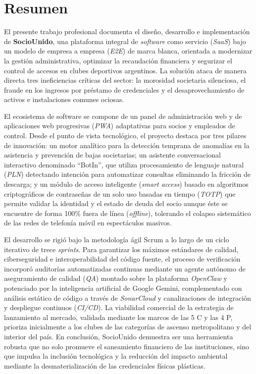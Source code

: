 \section{Resumen}

El presente trabajo profesional documenta el diseño, desarrollo e implementación de \textbf{SocioUnido}, una plataforma integral de \textit{software} como servicio (\textit{SaaS}) bajo un modelo de empresa a empresa (\textit{E2E}) de marca blanca, orientada a modernizar la gestión administrativa, optimizar la recaudación financiera y segurizar el control de accesos en clubes deportivos argentinos. La solución ataca de manera directa tres ineficiencias críticas del sector: la morosidad societaria silenciosa, el fraude en los ingresos por préstamo de credenciales y el desaprovechamiento de activos e instalaciones comunes ociosas.

El ecosistema de software se compone de un panel de administración web y de aplicaciones web progresivas (\textit{PWA}) adaptativas para socios y empleados de control. Desde el punto de vista tecnológico, el proyecto destaca por tres pilares de innovación: un motor analítico para la detección temprana de anomalías en la asistencia y prevención de bajas societarias; un asistente conversacional interactivo denominado ``BotIn'', que utiliza procesamiento de lenguaje natural (\textit{PLN}) detectando intención para automatizar consultas eliminando la fricción de descarga; y un módulo de acceso inteligente (\textit{smart access}) basado en algoritmos criptográficos de contraseñas de un solo uso basadas en tiempo (\textit{TOTP}) que permite validar la identidad y el estado de deuda del socio aunque éste se encuentre de forma 100\% fuera de línea (\textit{offline}), tolerando el colapso sistemático de las redes de telefonía móvil en espectáculos masivos.

El desarrollo se rigió bajo la metodología ágil Scrum a lo largo de un ciclo iterativo de trece \textit{sprints}. Para garantizar los máximos estándares de calidad, ciberseguridad e interoperabilidad del código fuente, el proceso de verificación incorporó auditorías automatizadas continuas mediante un agente autónomo de aseguramiento de calidad (\textit{QA}) montado sobre la plataforma \textit{OpenClaw} y potenciado por la inteligencia artificial de Google Gemini, complementado con análisis estático de código a través de \textit{SonarCloud} y canalizaciones de integración y despliegue continuos (\textit{CI/CD}). La viabilidad comercial de la estrategia de lanzamiento al mercado, validada mediante los marcos de las 5 C y las 4 P, prioriza inicialmente a los clubes de las categorías de ascenso metropolitano y del interior del país. En conclusión, SocioUnido demuestra ser una herramienta robusta que no solo promueve el saneamiento financiero de las instituciones, sino que impulsa la inclusión tecnológica y la reducción del impacto ambiental mediante la desmaterialización de las credenciales físicas plásticas.

